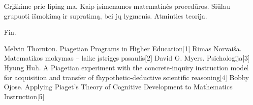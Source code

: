 \documentclass{article}
\begin{document}
Grįžkime prie liping ma. Kaip įsimenamos matematinės procedūros. Siūlau grupuoti išmokimą ir supratimą, bei jų lygmenis. Atminties teorija.

Fin.

Melvin Thornton. Piagetian Programs in Higher Education[1]
Rimas Norvaiša. Matematikos mokymas – laike įstrigęs pasaulis[2]
David G. Myers. Psichologija[3]
Hyung Huh. A Piagetian experiment with the concrete-inquiry instruction model for acquisition and transfer of fhypothetic-deductive scientific reasoning[4]
Bobby Ojose.                                                                                                                                                                                                                                                                                                                                                                                                                                                                                                                                                                                                                       Applying Piaget’s Theory of Cognitive Development to Mathematics Instruction[5]
\end{document}

